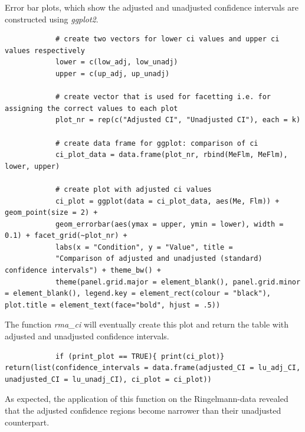 \documentclass[11pt]{article}
\begin{document}
		Error bar plots, which show the adjusted and unadjusted confidence intervals are constructed using
		\textit{ggplot2}.\\
		
		\begin{lstlisting}
			# create two vectors for lower ci values and upper ci values respectively
			lower = c(low_adj, low_unadj)
			upper = c(up_adj, up_unadj)
			
			# create vector that is used for facetting i.e. for assigning the correct values to each plot
			plot_nr = rep(c("Adjusted CI", "Unadjusted CI"), each = k)
			
			# create data frame for ggplot: comparison of ci
			ci_plot_data = data.frame(plot_nr, rbind(MeFlm, MeFlm), lower, upper)
			
			# create plot with adjusted ci values
			ci_plot = ggplot(data = ci_plot_data, aes(Me, Flm)) + geom_point(size = 2) +
			geom_errorbar(aes(ymax = upper, ymin = lower), width = 0.1) + facet_grid(~plot_nr) +
			labs(x = "Condition", y = "Value", title =
			"Comparison of adjusted and unadjusted (standard) confidence intervals") + theme_bw() +
			theme(panel.grid.major = element_blank(), panel.grid.minor = element_blank(), legend.key = element_rect(colour = "black"), plot.title = element_text(face="bold", hjust = .5))
		\end{lstlisting}
		
		The function \textit{rma_ci} will eventually create this plot and return the table with adjusted and unadjusted confidence intervals.\\
		
		\begin{lstlisting}
			if (print_plot == TRUE){ print(ci_plot)} return(list(confidence_intervals = data.frame(adjusted_CI = lu_adj_CI, unadjusted_CI = lu_unadj_CI), ci_plot = ci_plot))
		\end{lstlisting}	
		
		As expected, the application of this function on the Ringelmann-data revealed that the adjusted confidence regions become narrower than their unadjusted counterpart.\\
		
\end{document}
